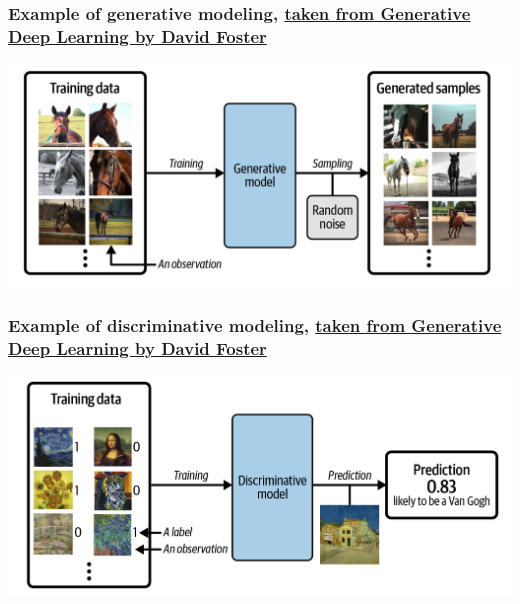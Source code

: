 \documentclass[11pt]{beamer} %
\begin{document}
\begin{frame}
\frametitle{Example of generative modeling, \href{{https://www.oreilly.com/library/view/generative-deep-learning/9781098134174/ch01.html}}{taken from Generative Deep Learning by David Foster}}

\vspace{6mm}

\centerline{\includegraphics[width=1.0\linewidth]{figures/generativelearning.png}}

\vspace{6mm}
\end{frame}

\begin{frame}
\frametitle{Example of discriminative modeling, \href{{https://www.oreilly.com/library/view/generative-deep-learning/9781098134174/ch01.html}}{taken from Generative Deep Learning by David Foster}}

\vspace{6mm}

\centerline{\includegraphics[width=1.0\linewidth]{figures/standarddeeplearning.png}}

\vspace{6mm}
\end{frame}
\end{document}
